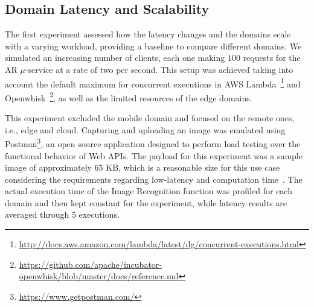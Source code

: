 \subsection{Domain Latency and Scalability} 



The first experiment assessed how the latency changes and the domains scale with a varying workload, providing a baseline to compare different domains. We simulated an increasing number of clients, each one making $100$ requests for the AR $\mu$-service at a rate of two per second. This setup was achieved taking into account the default maximum for concurrent executions in AWS Lambda~\footnote{\url{http://docs.aws.amazon.com/lambda/latest/dg/concurrent-executions.html}} and Openwhisk~\footnote{\url{https://github.com/apache/incubator-openwhisk/blob/master/docs/reference.md}}, as well as the limited resources of the edge domains. 

This experiment excluded the mobile domain and focused on the remote ones, i.e., edge and cloud. Capturing and uploading an image was emulated using Postman\footnote{\url{https://www.getpostman.com/}}, an open source application designed to perform load testing over the functional behavior of Web APIs. The payload for this experiment was a sample image of approximately 65 KB, which is a reasonable size for this use case considering the requirements regarding low-latency and computation time~\cite{rodriguez16mobile}. The actual execution time of the Image Recognition function was profiled for each domain and then kept constant for the experiment, while latency results are averaged through $5$ executions.



